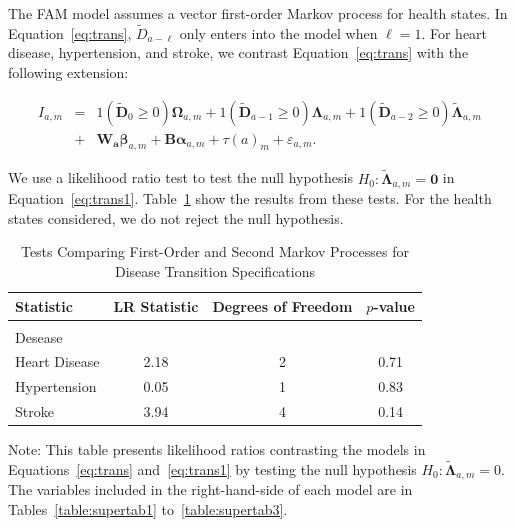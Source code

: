 \noindent The FAM model assumes a vector first-order Markov process for health states. In Equation~\eqref{eq:trans}, $\tilde{D}_{a - \ell}$ only enters into the model when $\ell = 1$. For heart disease, hypertension, and stroke, we contrast Equation~\eqref{eq:trans} with the following extension: 

\begin{eqnarray}
I_{a,m} &=& \bm{\mathit{1}} \left( \tilde{\bm{D}}_{0} \geq 0 \right) \bm{\Omega}_{a,m} + \bm{\mathit{1}} \left( \tilde{\bm{D}}_{a-1} \geq 0\right) \bm{\Lambda}_{a,m}  + \bm{\mathit{1}} \left( \tilde{\bm{D}}_{a-2} \geq 0\right) \tilde{\bm{\Lambda}}_{a,m} \nonumber \\ 
&+&  \bm{W_a} \bm{\beta}_{a,m} +  \bm{B} \bm{\alpha}_{a,m} + \tau \left( a \right)_{m} + \varepsilon_{a,m}. \label{eq:trans1}
\end{eqnarray}

We use a likelihood ratio test to test the null hypothesis $H_0: \tilde{\bm{\Lambda}}_{a,m} = \bm{0}$ in Equation~\eqref{eq:trans1}. Table~\ref{table:lrtests} show the results from these tests. For the health states considered, we do not reject the null hypothesis.

\begin{table}[H]
\begin{threeparttable}
\caption{Tests Comparing First-Order and Second Markov Processes for Disease Transition Specifications} \label{table:lrtests}
\centering
\footnotesize
\begin{tabular}{lccc}
\toprule
Statistic & LR Statistic & Degrees of Freedom & $p$-value \\
\midrule \\
Desease & \\
Heart Disease & 2.18 & 2 & 0.71 \\
Hypertension   & 0.05 & 1 & 0.83 \\
Stroke              & 3.94 & 4 & 0.14 \\
\bottomrule
\end{tabular}
\begin{tablenotes}
\footnotesize
\item Note: This table presents likelihood ratios contrasting the models in Equations~\ref{eq:trans} and~\eqref{eq:trans1} by testing the null hypothesis $H_0: \tilde{\bm{\Lambda}}_{a,m}=0$. The variables included in the right-hand-side of each model are in Tables~\ref{table:supertab1} to~\ref{table:supertab3}. 
\end{tablenotes}
\end{threeparttable}
\end{table}

